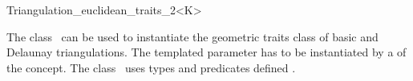 

\begin{ccRefClass}{Triangulation_euclidean_traits_2<K>}  %

\ccDefinition
  
The class \ccRefName\ can be used to instantiate the geometric traits
class of basic and Delaunay triangulations.
The templated parameter  has to
be instantiated by a \model of the  concept.
The class \ccRefName\  uses types 
and predicates defined .



\ccIsModel 

 \\


\ccSeeAlso
{} \\
 \\
\\
 \\
 \\


\end{ccRefClass}


